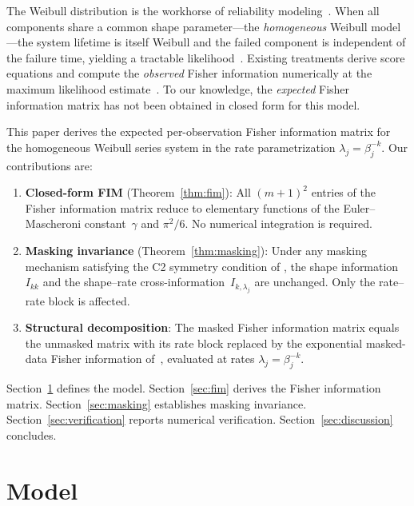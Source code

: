 \documentclass[12pt]{article}
\theoremstyle{remark}
\begin{document}
The Weibull distribution is the workhorse of reliability
modeling~\citep{lawless2003, meeker1998}.  When all components share a
common shape parameter---the \emph{homogeneous} Weibull model---the
system lifetime is itself Weibull and the failed component is independent
of the failure time, yielding a tractable
likelihood~\citep{pareek2009}.  Existing treatments derive score
equations and compute the \emph{observed} Fisher information numerically
at the maximum likelihood estimate~\citep{pareek2009, kundu2003}.  To
our knowledge, the \emph{expected} Fisher information matrix has not been
obtained in closed form for this model.

This paper derives the expected per-observation Fisher information matrix
for the homogeneous Weibull series system in the rate parametrization
$\lambda_j = \beta_j^{-k}$.  Our contributions are:
%
\begin{enumerate}
\item \textbf{Closed-form FIM} (Theorem~\ref{thm:fim}): All
  $(m{+}1)^2$ entries of the Fisher information matrix reduce to
  elementary functions of the Euler--Mascheroni constant~$\gamma$ and
  $\pi^2/6$.  No numerical integration is required.

\item \textbf{Masking invariance} (Theorem~\ref{thm:masking}): Under
  any masking mechanism satisfying the C2 symmetry condition of
  \citet{towell2025masked}, the shape information~$I_{kk}$ and the
  shape--rate cross-information~$I_{k,\lambda_j}$ are unchanged.  Only
  the rate--rate block is affected.

\item \textbf{Structural decomposition}: The masked Fisher information
  matrix equals the unmasked matrix with its rate block replaced by the
  exponential masked-data Fisher information
  of~\citet{towell2026exponential}, evaluated at rates
  $\lambda_j = \beta_j^{-k}$.
\end{enumerate}

Section~\ref{sec:model} defines the model.
Section~\ref{sec:fim} derives the Fisher information matrix.
Section~\ref{sec:masking} establishes masking invariance.
Section~\ref{sec:verification} reports numerical verification.
Section~\ref{sec:discussion} concludes.


\section{Model}\label{sec:model}
\end{document}
